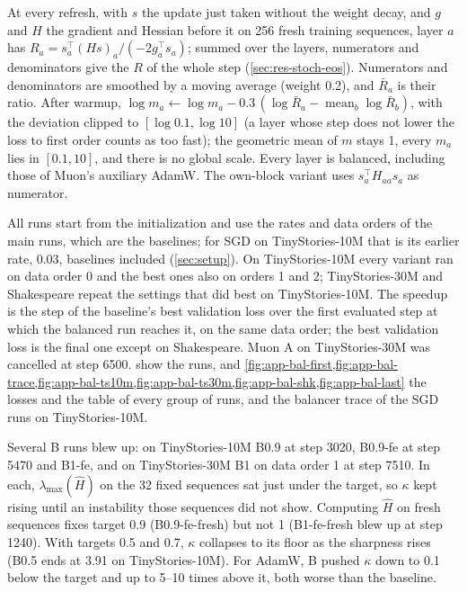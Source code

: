 \documentclass[10pt]{article}
\makeatletter
\renewcommand\paragraph{\@startsection{paragraph}{4}{\z@}{1.2ex \@plus .4ex \@minus .2ex}{-1em}{\normalfont\normalsize\bfseries}}
\DeclareMathOperator{\mean}{mean}
\newcommand{\lmax}{\lambda_{\max}}
\makeatother
\begin{document}
\paragraph{v2.} At every refresh, with $s$ the update just taken without the weight decay, and $g$ and $H$ the
gradient and Hessian before it on 256 fresh training sequences, layer $a$ has $R_a=s_a^\top(Hs)_a/(-2g_a^\top s_a)$;
summed over the layers, numerators and denominators give the $R$ of the whole step (\cref{sec:res-stoch-eos}).
Numerators and denominators are smoothed by a moving average (weight 0.2), and $\bar R_a$ is their ratio. After
warmup, $\log m_a\leftarrow\log m_a-0.3\,(\log\bar R_a-\mean_b\log\bar R_b)$, with the deviation clipped to
$[\log0.1,\log10]$ (a layer whose step does not lower the loss to first order counts as too fast); the geometric mean
of $m$ stays 1, every $m_a$ lies in $[0.1,10]$, and there is no global scale. Every layer is balanced, including those
of Muon's auxiliary AdamW. The own-block variant uses $s_a^\top H_{aa}s_a$ as numerator.

\paragraph{Runs.} All runs start from the initialization and use the rates and data orders of the main runs, which
are the baselines; for SGD on TinyStories-10M that is its earlier rate, 0.03, baselines included (\cref{sec:setup}). On TinyStories-10M every variant ran on data order 0 and the best ones also on orders 1 and 2;
TinyStories-30M and Shakespeare repeat the settings that did best on TinyStories-10M. The speedup is the step of the
baseline's best validation loss over the first evaluated step at which the balanced run reaches it, on the same data
order; the best validation loss is the final one except on Shakespeare. Muon A on TinyStories-30M was cancelled at
step 6500.  show the runs,
and \cref{fig:app-bal-first,fig:app-bal-trace,fig:app-bal-ts10m,fig:app-bal-ts30m,fig:app-bal-shk,fig:app-bal-last}
the losses and the table of every group of runs, and the balancer trace of the SGD runs on TinyStories-10M.

\paragraph{Failures.} Several B runs blew up: on TinyStories-10M B0.9 at step 3020, B0.9-fe at step 5470 and B1-fe,
and on TinyStories-30M B1 on data order 1 at step 7510. In each, $\lmax(\hat H)$ on the 32 fixed sequences sat just
under the target, so $\kappa$ kept rising until an instability those sequences did not show. Computing $\hat H$ on
fresh sequences fixes target 0.9 (B0.9-fe-fresh) but not 1 (B1-fe-fresh blew up at step 1240). With targets 0.5 and
0.7, $\kappa$ collapses to its floor as the sharpness rises (B0.5 ends at 3.91 on TinyStories-10M). For AdamW, B pushed
$\kappa$ down to 0.1 below the target and up to 5--10 times above it, both worse than the baseline.
\end{document}
